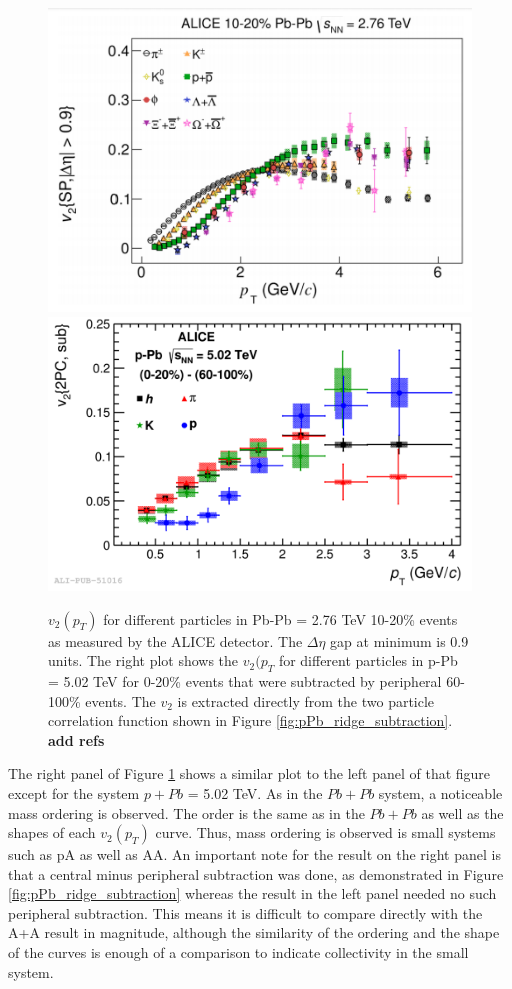\begin{figure}[h!]
\begin{center}
\includegraphics[width=0.48\linewidth]{figs/PbPb_v2_mass_ordering.PNG}
\includegraphics[width=0.48\linewidth]{figs/pPb_two_part_v2_mass_ordering.PNG}
\caption{$v_2(p_T)$ for different particles in Pb-Pb \sqsn = 2.76 TeV 10-20\% events as measured by the ALICE detector. The $\Delta\eta$ gap at minimum is 0.9 units. The right plot shows the $v_2(p_T$ for different particles in p-Pb \sqsn = 5.02 TeV for 0-20\% events that were subtracted by peripheral 60-100\% events. The $v_2$ is extracted directly from the two particle correlation function shown in Figure \ref{fig:pPb_ridge_subtraction}. \textbf{add refs}}
\label{fig:PbpPb_mass_ordering}
\end{center}
\end{figure}

The right panel of Figure \ref{fig:PbpPb_mass_ordering} shows a similar plot to the left panel of that figure except for the system $p+Pb$ \sqsn = 5.02 TeV. As in the $Pb+Pb$ system, a noticeable mass ordering is observed. The order is the same as in the $Pb+Pb$ as well as the shapes of each $v_2(p_T)$ curve. Thus, mass ordering is observed is small systems such as pA as well as AA. An important note for the result on the right panel is that a central minus peripheral subtraction was done, as demonstrated in Figure \ref{fig:pPb_ridge_subtraction} whereas the result in the left panel needed no such peripheral subtraction. This means it is difficult to compare directly with the A+A result in magnitude, although the similarity of the ordering and the shape of the curves is enough of a comparison to indicate collectivity in the small system.

